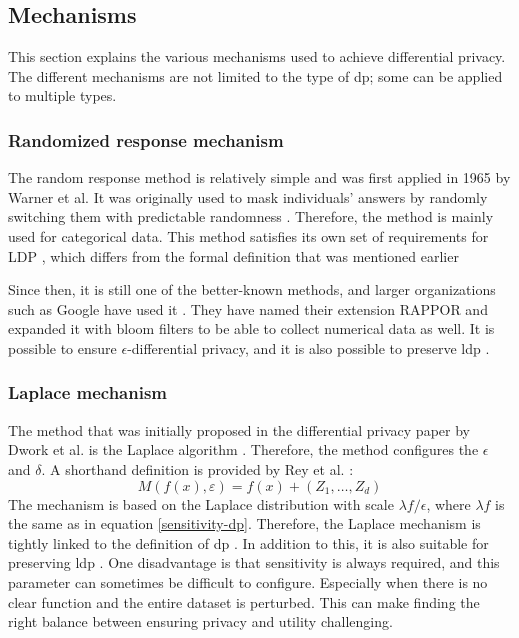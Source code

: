 \subsection{Mechanisms}
This section explains the various mechanisms used to achieve differential privacy.
The different mechanisms are not limited to the type of \gls{dp}; some can be applied to multiple types.
\subsubsection{Randomized response mechanism}
The random response method is relatively simple and was first applied in 1965 by Warner et al.
It was originally used to mask individuals' answers by randomly switching them with predictable randomness \citep{warner_randomized_1965}.
Therefore, the method is mainly used for categorical data.
This method satisfies its own set of requirements for LDP \citep{del_rey_comprehensive_2020}, which differs from the formal definition that was mentioned earlier

Since then, it is still one of the better-known methods, and larger organizations such as Google have used it \citep{erlingsson_rappor_2014}.
They have named their extension RAPPOR and expanded it with bloom filters to be able to collect numerical data as well.
It is possible to ensure $\epsilon$-differential privacy, and it is also possible to preserve \gls{ldp} \citep{del_rey_comprehensive_2020}.
\subsubsection{Laplace mechanism} \label{laplace}
The method that was initially proposed in the differential privacy paper by Dwork et al. is the Laplace algorithm \citep{dwork_differential_2006}.
Therefore, the method configures the $\epsilon$ and $\delta$. A shorthand definition is provided by Rey et al. \citep{del_rey_comprehensive_2020}:
\begin{equation}
  M\left(f\left(x\right),\varepsilon\right)=f\left(x\right)+\left(Z_{1},\ldots,Z_{d}\right)
\end{equation}
The mechanism is based on the Laplace distribution with scale $\lambda f/\epsilon$, where $\lambda f$ is the same as in equation \ref{sensitivity-dp}.
Therefore, the Laplace mechanism is tightly linked to the definition of \gls{dp} \citep{dwork_differential_2006}.
In addition to this, it is also suitable for preserving \gls{ldp} \citep{del_rey_comprehensive_2020}.
One disadvantage is that sensitivity is always required, and this parameter can sometimes be difficult to configure.
Especially when there is no clear function and the entire dataset is perturbed.
This can make finding the right balance between ensuring privacy and utility challenging.

